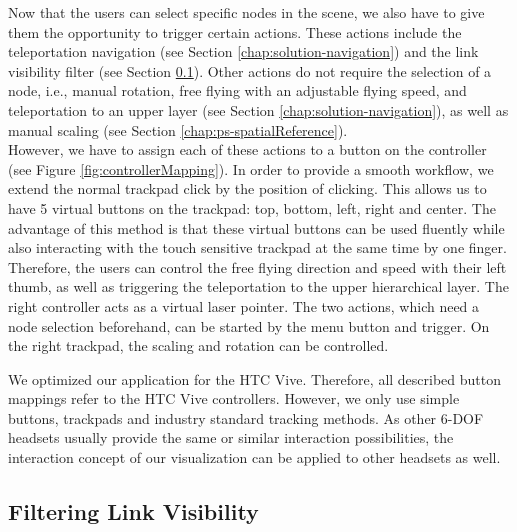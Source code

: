 Now that the users can select specific nodes in the scene, we also have to give them the opportunity to trigger certain actions. These actions include the teleportation navigation (see Section \ref{chap:solution-navigation}) and the link visibility filter (see Section \ref{chap:ps-filterLinks}). 
Other actions do not require the selection of a node, i.e., manual rotation, free flying with an adjustable flying speed, and teleportation to an upper layer (see Section \ref{chap:solution-navigation}), as well as manual scaling (see Section \ref{chap:ps-spatialReference}).\\
However, we have to assign each of these actions to a button on the controller (see Figure \ref{fig:controllerMapping}). In order to provide a smooth workflow, we extend the normal trackpad click by the position of clicking. 
This allows us to have 5 virtual buttons on the trackpad: top, bottom, left, right and center. The advantage of this method is that these virtual buttons can be used fluently while also interacting with the touch sensitive trackpad at the same time by one finger. 
Therefore, the users can control the free flying direction and speed with their left thumb, as well as triggering the teleportation to the upper hierarchical layer. The right controller acts as a virtual laser pointer. The two actions, which need a node selection beforehand, can be started by the menu button and trigger. 
On the right trackpad, the scaling and rotation can be controlled.

We optimized our application for the HTC Vive. Therefore, all described button mappings refer to the HTC Vive controllers. However, we only use simple buttons, trackpads and industry standard tracking methods. 
As other 6-DOF headsets usually provide the same or similar interaction possibilities, the interaction concept of our visualization can be applied to other headsets as well.

\subsection{Filtering Link Visibility}
\label{chap:ps-filterLinks}

